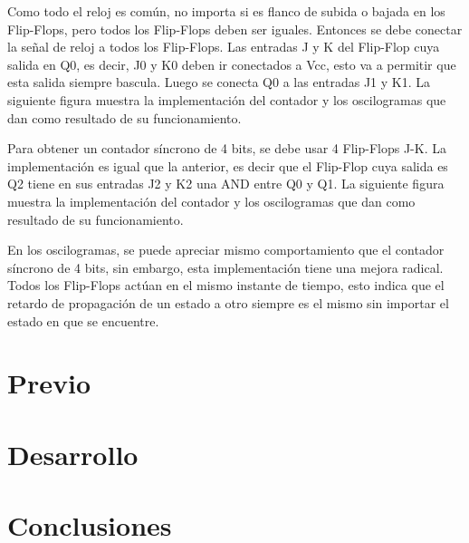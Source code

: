 \documentclass{mylib/reporteConCalif}
\begin{document}
Como todo el reloj es común, no importa si es flanco de subida o bajada en los Flip-Flops, pero todos los Flip-Flops deben ser iguales. Entonces se debe conectar la señal de reloj a todos los Flip-Flops. Las entradas J y K del Flip-Flop cuya salida en Q0, es decir, J0 y K0 deben ir conectados a Vcc, esto va a permitir que esta salida siempre bascula. Luego se conecta Q0 a las entradas J1 y K1. La siguiente figura muestra la implementación del contador y los oscilogramas que dan como resultado de su funcionamiento.

Para obtener un contador síncrono de 4 bits, se debe usar 4 Flip-Flops J-K. La implementación es igual que la anterior, es decir que el Flip-Flop cuya salida es Q2 tiene en sus entradas J2 y K2 una AND entre Q0 y Q1. La siguiente figura muestra la implementación del contador y los oscilogramas que dan como resultado de su funcionamiento.


En los oscilogramas, se puede apreciar mismo comportamiento que el contador síncrono de 4 bits, sin embargo, esta implementación tiene una mejora radical. Todos los Flip-Flops actúan en el mismo instante de tiempo, esto indica que el retardo de propagación de un estado a otro siempre es el mismo sin importar el estado en que se encuentre.

\newpage
\section{Previo}

\newpage
\section{Desarrollo}


\section{Conclusiones}
\end{document}
